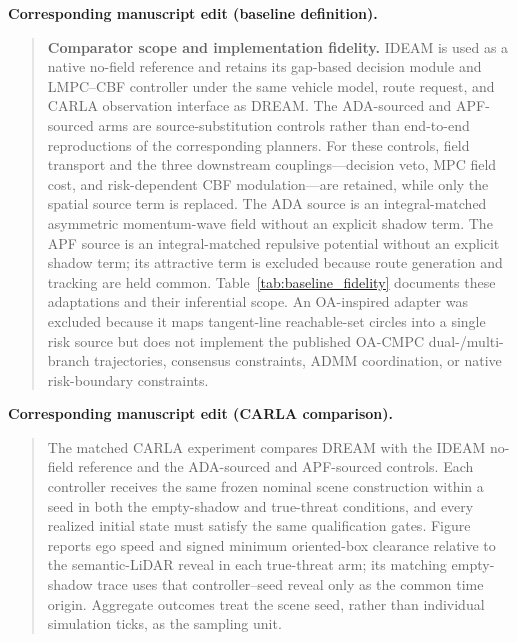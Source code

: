 \medskip
\noindent\textbf{Corresponding manuscript edit (baseline definition).}

\begin{quote}
\textbf{Comparator scope and implementation fidelity.}
IDEAM is used as a native no-field reference and retains its gap-based
decision module and LMPC--CBF controller under the same vehicle model, route
request, and CARLA observation interface as DREAM.  The ADA-sourced and
APF-sourced arms are source-substitution controls rather than end-to-end
reproductions of the corresponding planners.  For these controls, field
transport and the three downstream couplings---decision veto, MPC field cost,
and risk-dependent CBF modulation---are retained, while only the spatial
source term is replaced.  The ADA source is an integral-matched asymmetric
momentum-wave field without an explicit shadow term.  The APF source is an
integral-matched repulsive potential without an explicit shadow term; its
attractive term is excluded because route generation and tracking are held
common.  Table~\ref{tab:baseline_fidelity} documents these adaptations and
their inferential scope.  An OA-inspired adapter was excluded because it maps
tangent-line reachable-set circles into a single risk source but does not
implement the published OA-CMPC dual-/multi-branch trajectories, consensus
constraints, ADMM coordination, or native risk-boundary constraints.
\end{quote}

\noindent\textbf{Corresponding manuscript edit (CARLA comparison).}

\begin{quote}
The matched CARLA experiment compares DREAM with the IDEAM no-field reference
and the ADA-sourced and APF-sourced controls.  Each controller receives the
same frozen nominal scene construction within a seed in both the empty-shadow
and true-threat conditions, and every realized initial state must satisfy the
same qualification gates.  Figure~\CarlaFigureNumber{} reports ego speed and
signed minimum oriented-box clearance relative to the semantic-LiDAR reveal
in each true-threat arm; its matching empty-shadow trace uses that
controller--seed reveal only as the common time origin.  Aggregate outcomes
treat the scene seed, rather than individual
simulation ticks, as the sampling unit.  \CarlaEmptyShadowFinding{}
\CarlaThreatFinding{}
\end{quote}
